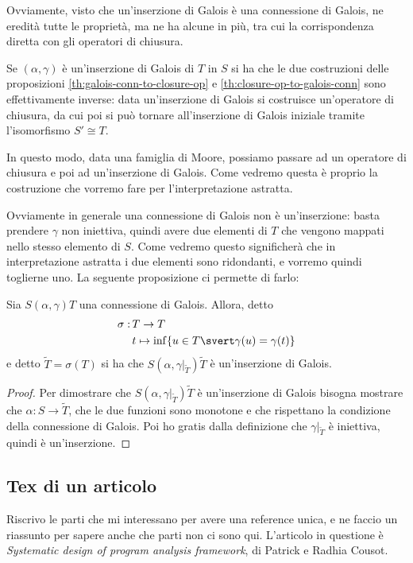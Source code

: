 \documentclass[12pt]{article}
\numberwithin{theorem}{subsection}
\begin{document}
Ovviamente, visto che un'inserzione di Galois è una connessione di Galois, ne eredità tutte le proprietà, ma ne ha alcune in più, tra cui la corrispondenza diretta con gli operatori di chiusura.
\begin{remark}
	Se $(\alpha, \gamma)$ è un'inserzione di Galois di $T$ in $S$ si ha che le due costruzioni delle proposizioni \ref{th:galois-conn-to-closure-op} e \ref{th:closure-op-to-galois-conn} sono effettivamente inverse: data un'inserzione di Galois si costruisce un'operatore di chiusura, da cui poi si può tornare all'inserzione di Galois iniziale tramite l'isomorfismo $S' \cong T$.
	
	In questo modo, data una famiglia di Moore, possiamo passare ad un operatore di chiusura e poi ad un'inserzione di Galois. Come vedremo questa è proprio la costruzione che vorremo fare per l'interpretazione astratta.
\end{remark}

Ovviamente in generale una connessione di Galois non è un'inserzione: basta prendere $\gamma$ non iniettiva, quindi avere due elementi di $T$ che vengono mappati nello stesso elemento di $S$. Come vedremo questo significherà che in interpretazione astratta i due elementi sono ridondanti, e vorremo quindi toglierne uno. La seguente proposizione ci permette di farlo:
\begin{prop}
	Sia $S (\alpha, \gamma) T$ una connessione di Galois. Allora, detto
	\begin{align*}
		\sigma : \, &T \rightarrow T \\
		&t \mapsto \inf \{ u \in T \svert \gamma(u) = \gamma(t) \}
	\end{align*}
	e detto $\tilde{T} = \sigma(T)$ si ha che $S (\alpha, \left. \gamma \right|_{\tilde{T}}) \tilde{T}$ è un'inserzione di Galois.
\end{prop}
\begin{proof}
	Per dimostrare che $S (\alpha, \left. \gamma \right|_{\tilde{T}}) \tilde{T}$ è un'inserzione di Galois bisogna mostrare che $\alpha : S \rightarrow \tilde{T}$, che le due funzioni sono monotone e che rispettano la condizione della connessione di Galois. Poi ho gratis dalla definizione che $\left. \gamma \right|_{\tilde{T}}$ è iniettiva, quindi è un'inserzione.
\end{proof}


\subsection{Tex di un articolo}
Riscrivo le parti che mi interessano per avere una reference unica, e ne faccio un riassunto per sapere anche che parti non ci sono qui. L'articolo in questione è \textit{Systematic design of program analysis framework}, di Patrick e Radhia Cousot.
\end{document}
